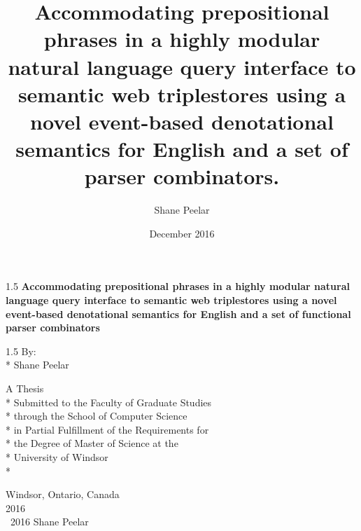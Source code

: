 \documentclass[fleqn, oneside, 12pt]{book}
\author{Shane Peelar}
\title{Accommodating prepositional phrases in a highly modular
	natural language query interface to semantic web triplestores using a novel event-based denotational semantics for English and a set of parser combinators.}
\date{December 2016}
\theoremstyle{definitionsty}
\newcommand{\uwinonehalfspacelen}{1.5}
\newenvironment{uwinonehalfspaceenv}%
{\begin{spacing}{\uwinonehalfspacelen}}%
	{\end{spacing}}
\begin{document}
	
\renewcommand{\gitMark}{
	Branch: \gitBranch\,@\,\gitAbbrevHash{} 
	\textbullet{} 
	Release:\gitReln{} 
	(\gitAuthorDate)
}
	


\clearpage

\thispagestyle{empty}
\begin{center}
	\vspace*{1in}
	
	\begin{uwinonehalfspaceenv}
		\Large\textbf{Accommodating prepositional phrases in a highly modular
			natural language query interface to semantic web triplestores using a novel event-based denotational semantics for English and a set of functional parser combinators}
	\end{uwinonehalfspaceenv}
	
	\vspace{\fill} %
	\begin{uwinonehalfspaceenv}
		By:\\*
		Shane Peelar
	\end{uwinonehalfspaceenv}
	\vspace{\fill}
	
	\normalsize
	A Thesis \\*
	Submitted to the Faculty of Graduate Studies \\*
	through the School of Computer Science \\*
	in Partial Fulfillment of the Requirements for \\*
	the Degree of Master of Science at the \\*
	University of Windsor \\*
	
	\vspace{1in}
	Windsor, Ontario, Canada \\
	\vspace{0.5cm}
	2016 \\
	\vspace{0.5cm}
	\textcopyright \  2016 Shane Peelar
\end{center}



\clearpage
\thispagestyle{empty}
\end{document}
